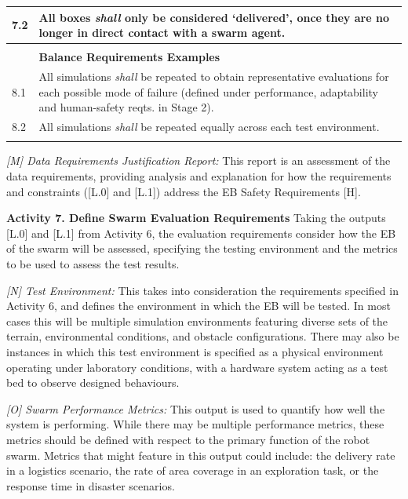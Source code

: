 \documentclass[runningheads]{llncs}
\begin{document}
\begin{table}[!t]
\begin{tabular}{p{0.5cm} p{12.9cm}}
	\hline
	7.2 & All boxes \emph{shall} only be considered `delivered’, once they are no longer in direct contact with a swarm agent.\\
	\hline \\[-1.25\medskipamount]
	& \textbf{Balance Requirements Examples} \\
	\hline
	8.1 & All simulations \emph{shall} be repeated to obtain representative evaluations for each possible mode of failure (defined under performance, adaptability and human-safety reqts. in Stage 2).\\
	\hline
	8.2 & All simulations \emph{shall} be repeated equally across each test environment.\\
	\hline \\[-1\medskipamount] %
\end{tabular}
\vspace{-4ex}%
\end{table}

\emph{[M] Data Requirements Justification Report:}
This report is an assessment of the data requirements, providing analysis and explanation for how the requirements and constraints ([L.0] and [L.1]) address the EB Safety Requirements [H].

\noindent\textbf{Activity 7. Define Swarm Evaluation Requirements} Taking the outputs [L.0] and [L.1] from Activity 6, the evaluation requirements consider how the EB of the swarm will be assessed, specifying the testing environment and the metrics to be used to assess the test results. %

\emph{[N] Test Environment:} This takes into consideration the requirements specified in Activity 6, and defines the environment in which the EB will be tested. In most cases this will be multiple simulation environments featuring diverse sets of the terrain, environmental conditions, and obstacle configurations. There may also be instances in which this test environment is specified as a physical environment operating under laboratory conditions, with a hardware system acting as a test bed to observe designed behaviours.

\emph{[O] Swarm Performance Metrics:} This output is used to quantify how well the system is performing. While there may be multiple performance metrics, these metrics should be defined with respect to the primary function of the robot swarm. Metrics that might feature in this output could include: the delivery rate in a logistics scenario, the rate of area coverage in an exploration task, or the response time in disaster scenarios.
\end{document}
